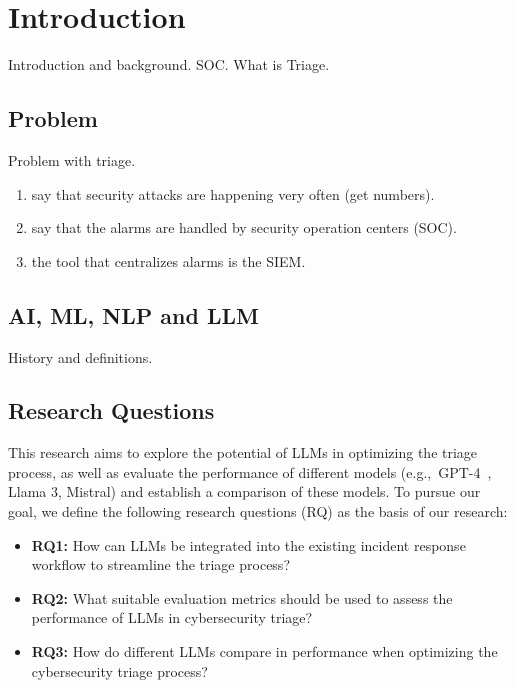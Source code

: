 \section{Introduction}
\label{sec:introduction}

Introduction and background.
SOC\@.
What is Triage.

\subsection{Problem}
\label{subsec:intro-problem}

Problem with triage.

\begin{enumerate}
    \item say that security attacks are happening very often (get numbers).
    \item say that the alarms are handled by security operation centers (SOC).
    \item the tool that centralizes alarms is the SIEM\@.
\end{enumerate}

\subsection{AI, ML, NLP and LLM}
\label{subsec:intro-definitions}

History and definitions.

\subsection{Research Questions}
\label{subsec:intro-research-questions}


This research aims to explore the potential of LLMs in optimizing the triage process, as well as evaluate the
performance of different models (e.g.,\ GPT-4\ \citep{achiam2023gpt}, Llama 3, Mistral) and establish a comparison of
these models.
To pursue our goal, we define the following research questions (RQ) as the basis of our research:

\begin{itemize}
    \item \textbf{RQ1:} How can LLMs be integrated into the existing incident response workflow to streamline the triage process?
    \item \textbf{RQ2:} What suitable evaluation metrics should be used to assess the performance of LLMs in cybersecurity triage?
    \item \textbf{RQ3:} How do different LLMs compare in performance when optimizing the cybersecurity triage process?
\end{itemize}
